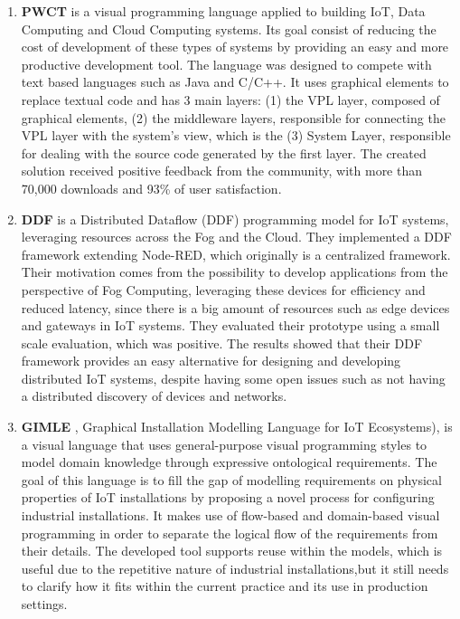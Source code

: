 \begin{enumerate}
    \item \textbf{PWCT} \cite{pwct} is a visual programming language applied to building IoT, Data Computing and Cloud Computing systems. Its goal consist of reducing the cost of development of these types of systems by providing an easy and more productive development tool. The language was designed to compete with text based languages such as Java and C/C++. It uses graphical elements to replace textual code and has 3 main layers: (1) the VPL layer, composed of graphical elements, (2) the middleware layers, responsible for connecting the VPL layer with the system's view, which is the (3) System Layer, responsible for dealing with the source code generated by the first layer. The created solution received positive feedback from the community, with more than 70,000 downloads and 93\% of user satisfaction.
    \item \textbf{DDF} \cite{ddf} is a Distributed Dataflow (DDF) programming model for IoT systems, leveraging resources across the Fog and the Cloud. They implemented a DDF framework extending Node-RED, which originally is a centralized framework. Their motivation comes from the possibility to develop applications from the perspective of Fog Computing, leveraging these devices for efficiency and reduced latency, since there is a big amount of resources such as edge devices and gateways in IoT systems. They evaluated their prototype using a small scale evaluation, which was positive. The results showed that their DDF framework provides an easy alternative for designing and developing distributed IoT systems, despite having some open issues such as not having a distributed discovery of devices and networks.
    \item \textbf{GIMLE} \cite{gimle}, Graphical Installation Modelling Language for IoT Ecosystems), is a visual language that uses general-purpose visual programming styles to model domain knowledge through expressive ontological requirements. The goal of this language is to fill the gap of modelling requirements on physical properties of IoT installations by proposing a novel process for configuring industrial installations. It makes use of flow-based and domain-based visual programming in order to separate the logical flow of the requirements from their details. The developed tool supports reuse within the models, which is useful due to the repetitive nature of industrial installations,but it still needs to clarify how it fits within the current practice and its use in production settings.

\end{enumerate}
